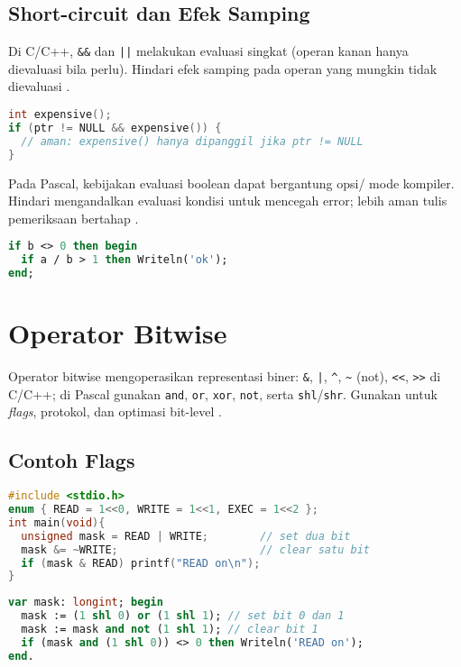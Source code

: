\documentclass[../main.tex]{subfiles}
\begin{document}
\subsection{Short-circuit dan Efek Samping}
Di C/C++, \texttt{&&} dan \texttt{||} melakukan evaluasi singkat (operan kanan hanya dievaluasi bila perlu). Hindari efek samping pada operan yang mungkin tidak dievaluasi \parencite{gnu-c-manual,cpp-reference}.
\begin{lstlisting}[language=C, caption={Short-circuit di C}]
int expensive();
if (ptr != NULL && expensive()) {
  // aman: expensive() hanya dipanggil jika ptr != NULL
}
\end{lstlisting}
Pada Pascal, kebijakan evaluasi boolean dapat bergantung opsi/ mode kompiler. Hindari mengandalkan evaluasi kondisi untuk mencegah error; lebih aman tulis pemeriksaan bertahap \parencite{free-pascal-docs}.
\begin{lstlisting}[language=Pascal, caption={Pemeriksaan bertahap di Pascal}]
if b <> 0 then begin
  if a / b > 1 then Writeln('ok');
end;
\end{lstlisting}

\section{Operator Bitwise}
Operator bitwise mengoperasikan representasi biner: \texttt{\&}, \texttt{|}, \texttt{\^{}}, \texttt{\~{}} (not), \texttt{<<}, \texttt{>>} di C/C++; di Pascal gunakan \texttt{and}, \texttt{or}, \texttt{xor}, \texttt{not}, serta \texttt{shl}/\texttt{shr}. Gunakan untuk \emph{flags}, protokol, dan optimasi bit-level \parencite{free-pascal-docs,iso-c-draft-n1570,cpp-reference}.

\subsection{Contoh Flags}
\begin{lstlisting}[language=C, caption={Bit flags di C}]
#include <stdio.h>
enum { READ = 1<<0, WRITE = 1<<1, EXEC = 1<<2 };
int main(void){
  unsigned mask = READ | WRITE;        // set dua bit
  mask &= ~WRITE;                      // clear satu bit
  if (mask & READ) printf("READ on\n");
}
\end{lstlisting}

\begin{lstlisting}[language=Pascal, caption={Pergeseran dan bitwise di Pascal}]
var mask: longint; begin
  mask := (1 shl 0) or (1 shl 1); // set bit 0 dan 1
  mask := mask and not (1 shl 1); // clear bit 1
  if (mask and (1 shl 0)) <> 0 then Writeln('READ on');
end.
\end{lstlisting}
\end{document}
